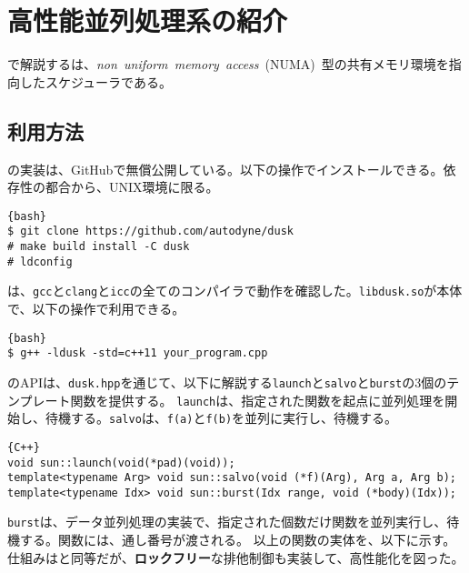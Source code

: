 \documentclass[10pt,a4paper]{book}
\begin{document}
\chapter{高性能並列処理系の紹介\label{chap:dusk}}

で解説する\dusk{}は、\textit{non~uniform~memory~access}~(NUMA)~型の共有メモリ環境を指向したスケジューラである。

\section{利用方法\label{sect:dusk.api}}

\dusk{}の実装は、GitHubで無償公開している。以下の操作でインストールできる。依存性の都合から、UNIX環境に限る。

\begin{Verbatim}{bash}
$ git clone https://github.com/autodyne/dusk
# make build install -C dusk
# ldconfig
\end{Verbatim}

\dusk{}は、\texttt{gcc}と\texttt{clang}と\texttt{icc}の全てのコンパイラで動作を確認した。\texttt{libdusk.so}が本体で、以下の操作で利用できる。

\begin{Verbatim}{bash}
$ g++ -ldusk -std=c++11 your_program.cpp
\end{Verbatim}

\dusk{}のAPIは、\texttt{dusk.hpp}を通じて、以下に解説する\texttt{launch}と\texttt{salvo}と\texttt{burst}の3個のテンプレート関数を提供する。
\texttt{launch}は、指定された関数を起点に並列処理を開始し、待機する。\texttt{salvo}は、\texttt{f(a)}と\texttt{f(b)}を並列に実行し、待機する。

\begin{Verbatim}{C++}
void sun::launch(void(*pad)(void));
template<typename Arg> void sun::salvo(void (*f)(Arg), Arg a, Arg b);
template<typename Idx> void sun::burst(Idx range, void (*body)(Idx));
\end{Verbatim}

\texttt{burst}は、データ並列処理の実装で、指定された個数だけ関数を並列実行し、待機する。関数には、通し番号が渡される。
以上の関数の実体を、以下に示す。仕組みはと同等だが、\textbf{ロックフリー}な排他制御も実装して、高性能化を図った。
\end{document}
